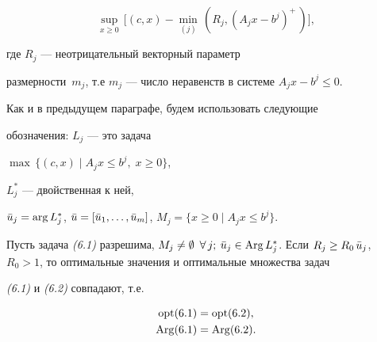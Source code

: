 \begin{equation}


\sup_{x \ge 0}\, \bigl[(c, x) -\min_{(j)}\, (R_j, (A_j x -b^j)^+\, )\bigr],


\end{equation}


где $R_j$ --- неотрицательный векторный параметр


размерности~$m_j$, т.е $m_j$ --- число неравенств в системе $A_j


x - b^j \le 0$.





Как и в предыдущем параграфе, будем использовать следующие


обозначения: $L_j$ --- это задача


$\max\, \{ (c, x) \mid A_j x \le b^j,\; x \ge 0 \}$,


$L_j^*$ --- двойственная к ней,


$\Bar{u}_j =\arg L_j^*$, $\Bar{u} = [


\nk{\Bar{u}_1}{\Bar{u}_m} ]$, $M_j = \{ x \ge 0 \mid A_j x \le


b^j \}$.





\begin{thms}


Пусть задача {\em (6.1)} разрешима, $M_j \ne


\emp$ $\fo\, j;$ $\Bar{u}_j \in


\Arg L_j^{\ast}$. Если $R_j \ge R_0\, \Bar{u}_j$, $R_0 >


1$, то оптимальные значения и оптимальные множества задач


{\em (6.1)} и {\em (6.2)} совпадают, т.е.


\begin{align}


\opt (6.1) & =\opt (6.2),\\


%


\Arg (6.1) &=\Arg (6.2).


\end{align}


\end{thms}





